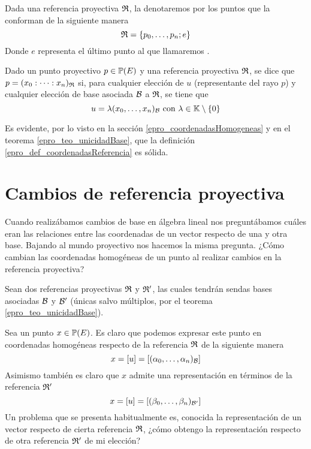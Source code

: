 Dada una referencia proyectiva $\mathfrak{R}$, la denotaremos por los puntos que la conforman de la siguiente manera
\begin{equation}
\label{epro_eq_notacionReferencias}
\mathfrak{R}=\{p_0,\dots,p_n;e\}
\end{equation}
Donde $e$ representa el último punto al que llamaremos .
\begin{defi}
	\label{epro_def_coordenadasReferencia}
	Dado un punto proyectivo $p\in\mathbb{P}(E)$ y una referencia proyectiva $\mathfrak{R}$, se dice que $p=(x_0:\dots :x_n)_{\mathfrak{R}}$ si, para cualquier elección de $u$ (representante del rayo $p$) y cualquier elección de base asociada $\mathcal{B}$ a $\mathfrak{R}$, se tiene que
	\begin{equation*}
		u=\lambda(x_0,\dots,x_n)_{\mathcal{B}}\text{ con } \lambda\in\mathbb{K}\setminus\{0\}
	\end{equation*}
\end{defi}
Es evidente, por lo visto en la sección \ref{epro_coordenadasHomogeneas} y en el teorema \ref{epro_teo_unicidadBase}, que la definición \ref{epro_def_coordenadasReferencia} es sólida.
\section{Cambios de referencia proyectiva}
Cuando realizábamos cambios de base en álgebra lineal nos preguntábamos cuáles eran las relaciones entre las coordenadas de un vector respecto de una y otra base. Bajando al mundo proyectivo nos hacemos la misma pregunta. ¿Cómo cambian las coordenadas homogéneas de un punto al realizar cambios en la referencia proyectiva?

Sean dos referencias proyectivas $\mathfrak{R}$ y $\mathfrak{R}'$, las cuales tendrán sendas bases asociadas $\mathcal{B}$ y $\mathcal{B}'$ (únicas salvo múltiplos, por el teorema \ref{epro_teo_unicidadBase}).

Sea un punto $x\in\mathbb{P}(E)$. Es claro que podemos expresar este punto en coordenadas homogéneas respecto de la referencia $\mathfrak{R}$ de la siguiente manera
\begin{equation*}
	x=\left [ u \right ]=\left [ (\alpha_0,\dots,\alpha_n)_{\mathcal{B}} \right ]
\end{equation*}
Asimismo también es claro que $x$ admite una representación en términos de la referencia $\mathfrak{R}'$
\begin{equation*}
	x=\left [ u \right ]=\left [ (\beta_0,\dots,\beta_n)_{\mathcal{B}'} \right ]
\end{equation*}
Un problema que se presenta habitualmente es, conocida la representación de un vector respecto de cierta referencia $\mathfrak{R}$, ¿cómo obtengo la representación respecto de otra referencia $\mathfrak{R}'$ de mi elección?

